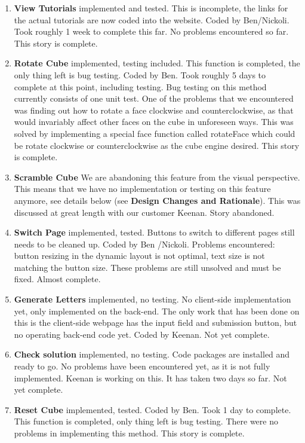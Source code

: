 \documentclass[12pt]{article}
\begin{document}
\begin{enumerate}
	\item \textbf{View Tutorials} implemented and tested. This is incomplete, the links for the actual tutorials are now coded into the website. Coded by Ben/Nickoli. Took roughly 1 week to complete this far. No problems encountered so far. This story is complete.
	\item \textbf{Rotate Cube} implemented, testing included. This function is completed, the only thing left is bug testing. Coded by Ben. Took roughly 5 days to complete at this point, including testing. Bug testing on this method currently consists of one unit test. One of the problems that we encountered was finding out how to rotate a face clockwise and counterclockwise, as that would invariably affect other faces on the cube in unforeseen ways. This was solved by implementing a special face function called rotateFace which could be rotate clockwise or counterclockwise as the cube engine desired. This story is complete.
	\item \textbf{Scramble Cube} We are abandoning this feature from the visual perspective. This means that we have no implementation or testing on this feature anymore, see details below (see \textbf{Design Changes and Rationale}). This was discussed at great length with our customer Keenan. Story abandoned.
	\item \textbf{Switch Page} implemented, tested. Buttons to switch to different pages still needs to be cleaned up. Coded by Ben /Nickoli. Problems encountered: button resizing in the dynamic layout is not optimal, text size is not matching the button size. These problems are still unsolved and must be fixed. Almost complete.
	\item \textbf{Generate Letters} implemented, no testing. No client-side implementation yet, only implemented on the back-end. The only work that has been done on this is the client-side webpage has the input field and submission button, but no operating back-end code yet. Coded by Keenan. Not yet complete.
	\item \textbf{Check solution} implemented, no testing. Code packages are installed and ready to go. No problems have been encountered yet, as it is not fully implemented. Keenan is working on this. It has taken two days so far. Not yet complete.
	\item \textbf{Reset Cube} implemented, tested. Coded by Ben. Took 1 day to complete. This function is completed, only thing left is bug testing. There were no problems in implementing this method. This story is complete.

\end{enumerate}
\end{document}
